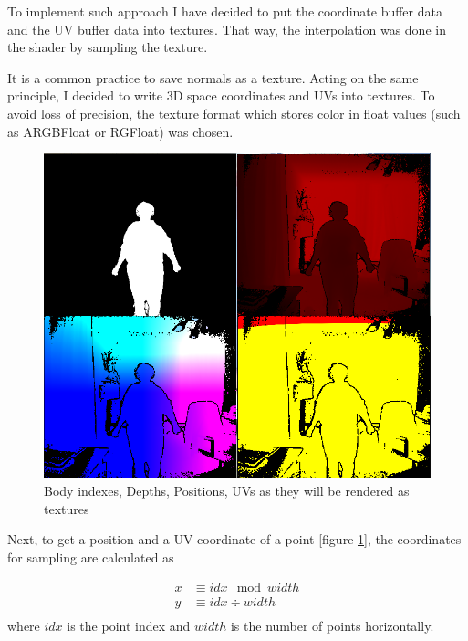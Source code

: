 \documentclass[a4paper]{report}
\begin{document}
To implement such approach I have decided to put the coordinate buffer data and the UV buffer data into textures. That way, the interpolation was done in the shader by sampling the texture.




 \bigskip It is a common practice to save normals as a texture. Acting on the same principle, I decided to write 3D space coordinates and UVs into textures. To avoid loss of precision, the texture format which stores color in float values (such as ARGBFloat or RGFloat) was chosen.

\begin{figure}[H]
\centering
  \includegraphics[width=\textwidth , keepaspectratio]{images/ClothesDemos/Screenshot 2021-05-14 184422.png}
\caption{Body indexes, Depths, Positions, UVs as they will be rendered as textures}
\label{fig:pc_demo_2}
\end{figure}

Next, to get a position and a UV coordinate of a point [figure \ref{fig:pc_demo_2}], the coordinates for sampling are calculated as 

\begin{align*}
x &\equiv idx \mod width \\
y &\equiv idx   \div   width \\
\end{align*}
where $idx$ is the point index and $width$ is the number of points horizontally.
\end{document}
